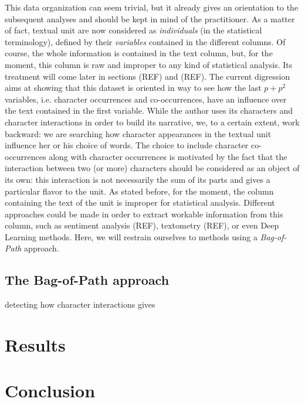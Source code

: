 \documentclass[
twocolumn,
]{ceurart}
\begin{document}
This data organization can seem trivial, but it already gives an orientation to the subsequent analyses and should be kept in mind of the practitioner. As a matter of fact, textual unit are now considered as \emph{individuals} (in the statistical terminology), defined by their \emph{variables} contained in the different columns. Of course, the whole information is contained in the text column, but, for the moment, this column is raw and improper to any kind of statistical analysis. Its treatment will come later in sections (REF) and (REF). The current digression aims at showing that this dataset is oriented in way to see how the last $p + p^2$ variables, i.e. character occurrences and co-occurrences, have an influence over the text contained in the first variable. While the author uses its characters and character interactions in order to build its narrative, we, to a certain extent, work backward: we are searching how character appearances in the textual unit influence her or his choice of words. The choice to include character co-occurrences along with character occurrences is motivated by the fact that the interaction between two (or more) characters should be considered as an object of its own: this interaction is not necessarily the sum of its parts and gives a particular flavor to the unit.
As stated before, for the moment, the column containing the text of the unit is improper for statistical analysis. Different approaches could be made in order to extract workable information from this column, such as sentiment analysis (REF), textometry (REF), or even Deep Learning methods. Here, we will restrain ourselves to methods using a \emph{Bag-of-Path} approach.

\subsection{The Bag-of-Path approach}


detecting how character interactions gives 


\section{Results}

\section{Conclusion}


\end{document}
